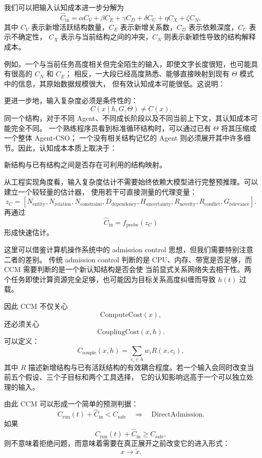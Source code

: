 我们可以把输入认知成本进一步分解为
\[
\widehat C_{\mathrm{in}}
=
\alpha C_V
+
\beta C_E
+
\gamma C_D
+
\delta C_U
+
\eta C_X
+
\zeta C_N,
\]
其中 $C_V$ 表示新增活跃结构数量，$C_E$ 表示新增关系数，$C_D$ 表示依赖深度，$C_U$ 表示不确定性，
$C_X$ 表示与当前结构之间的冲突，$C_N$ 则表示新颖性导致的结构解释成本。

例如，一个与当前任务高度相关但完全陌生的输入，即使文字长度很短，也可能具有很高的 $C_N$ 和 $C_E$；
相反，一大段已经高度熟悉、能够直接映射到现有 $\Theta$ 模式中的信息，其原始数据规模很大，
但有效认知成本可能很低。这说明：
\begin{statementbox}
\centering
{}
\end{statementbox}

更进一步地，输入复杂度必须是条件性的：
\[
C(x\mid h,G,\Theta)
\neq
C(x).
\]
同一个结构，对于不同 Agent、不同成长阶段以及不同当前上下文，其认知成本可能完全不同。
一个熟练程序员看到标准循环结构时，可以通过已有 $\Theta$ 将其压缩成一个整体 Agent-CSO；
一个没有相关结构记忆的 Agent 则必须展开其中许多细节。因此，认知成本本质上取决于：
\begin{statementbox}
新结构与已有结构之间是否存在可利用的结构映射。
\end{statementbox}

从工程实现角度看，输入复杂度估计不需要始终依赖大模型进行完整预推理。可以建立一个较轻量的估计器，
使用若干可直接测量的代理变量：
\[
z_C
=
[
N_{\mathrm{entity}},
N_{\mathrm{relation}},
N_{\mathrm{constraint}},
D_{\mathrm{dependency}},
H_{\mathrm{uncertainty}},
R_{\mathrm{novelty}},
R_{\mathrm{conflict}},
G_{\mathrm{relevance}}
].
\]
再通过
\[
\widehat C_{\mathrm{in}}
=
f_{\mathrm{probe}}(z_C)
\]
形成快速估计。

这里可以借鉴计算机操作系统中的 admission control 思想，但我们需要特别注意二者的差别。
传统 admission control 判断的是 CPU、内存、带宽是否足够，而 CCM 需要判断的是一个新认知结构是否会使
当前显式关系网络失去相干性。两个任务即使计算资源完全足够，也可能因为目标关系高度纠缠而导致
$h(t)$ 过载。

因此 CCM 不仅关心
\[
\mathrm{ComputeCost}(x),
\]
还必须关心
\[
\mathrm{CouplingCost}(x,h).
\]
可以定义：
\[
C_{\mathrm{couple}}(x,h)
=
\sum_{c_i\in h}
w_i
R(x,c_i),
\]
其中 $R$ 描述新增结构与已有活跃结构的有效耦合程度。若一个输入会同时改变当前五个假设、三个子目标和两个工具选择，
它的认知影响远高于一个可以独立处理的输入。

由此 CCM 可以形成一个简单的预测判据：
\[
C_{\mathrm{run}}(t)
+
\widehat C_{\mathrm{in}}
<
C_{\mathrm{safe}}
\quad
\Rightarrow
\quad
\mathrm{DirectAdmission}.
\]
如果
\[
C_{\mathrm{run}}(t)
+
\widehat C_{\mathrm{in}}
\geq
C_{\mathrm{safe}},
\]
则不意味着拒绝问题，而意味着需要在真正展开之前改变它的进入形式：
\[
x
\longrightarrow
\widetilde{x}.
\]

